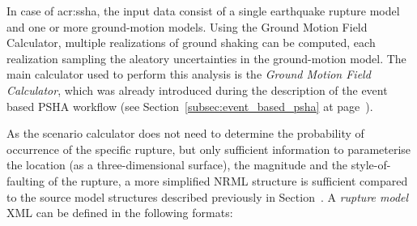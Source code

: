 In case of \gls{acr:ssha}, the input data consist of a single earthquake
rupture model and one or more ground-motion models. Using the Ground Motion
Field Calculator, multiple realizations of ground shaking can be computed,
each realization sampling the aleatory uncertainties in the ground-motion
model. The main calculator used to perform this analysis is the \emph{Ground
Motion Field Calculator}, which was already introduced during the description
of the event based PSHA workflow (see Section~\ref{subsec:event_based_psha} at
page~\pageref{subsec:event_based_psha}).

As the scenario calculator does not need to determine the probability of
occurrence of the specific rupture, but only sufficient information to
parameterise the location (as a three-dimensional surface), the magnitude and
the style-of-faulting of the rupture, a more simplified NRML structure is
sufficient compared to the source model structures described previously in
Section~\label{sec:source_typologies}.
A \emph{rupture model} XML can be defined in the following formats:

